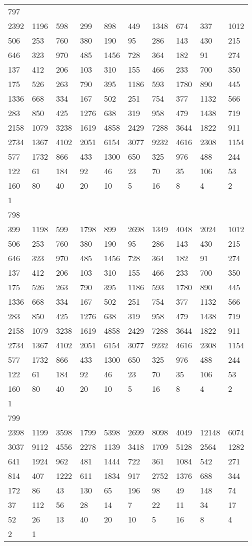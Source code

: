 \begin{longtable}{*{10}{l}}
797&&&&&&&&&\\
2392& 1196& 598& 299& 898& 449& 1348& 674& 337& 1012\\
506& 253& 760& 380& 190& 95& 286& 143& 430& 215\\
646& 323& 970& 485& 1456& 728& 364& 182& 91& 274\\
137& 412& 206& 103& 310& 155& 466& 233& 700& 350\\
175& 526& 263& 790& 395& 1186& 593& 1780& 890& 445\\
1336& 668& 334& 167& 502& 251& 754& 377& 1132& 566\\
283& 850& 425& 1276& 638& 319& 958& 479& 1438& 719\\
2158& 1079& 3238& 1619& 4858& 2429& 7288& 3644& 1822& 911\\
2734& 1367& 4102& 2051& 6154& 3077& 9232& 4616& 2308& 1154\\
577& 1732& 866& 433& 1300& 650& 325& 976& 488& 244\\
122& 61& 184& 92& 46& 23& 70& 35& 106& 53\\
160& 80& 40& 20& 10& 5& 16& 8& 4& 2\\
1& \\

798&&&&&&&&&\\
399& 1198& 599& 1798& 899& 2698& 1349& 4048& 2024& 1012\\
506& 253& 760& 380& 190& 95& 286& 143& 430& 215\\
646& 323& 970& 485& 1456& 728& 364& 182& 91& 274\\
137& 412& 206& 103& 310& 155& 466& 233& 700& 350\\
175& 526& 263& 790& 395& 1186& 593& 1780& 890& 445\\
1336& 668& 334& 167& 502& 251& 754& 377& 1132& 566\\
283& 850& 425& 1276& 638& 319& 958& 479& 1438& 719\\
2158& 1079& 3238& 1619& 4858& 2429& 7288& 3644& 1822& 911\\
2734& 1367& 4102& 2051& 6154& 3077& 9232& 4616& 2308& 1154\\
577& 1732& 866& 433& 1300& 650& 325& 976& 488& 244\\
122& 61& 184& 92& 46& 23& 70& 35& 106& 53\\
160& 80& 40& 20& 10& 5& 16& 8& 4& 2\\
1& \\

799&&&&&&&&&\\
2398& 1199& 3598& 1799& 5398& 2699& 8098& 4049& 12148& 6074\\
3037& 9112& 4556& 2278& 1139& 3418& 1709& 5128& 2564& 1282\\
641& 1924& 962& 481& 1444& 722& 361& 1084& 542& 271\\
814& 407& 1222& 611& 1834& 917& 2752& 1376& 688& 344\\
172& 86& 43& 130& 65& 196& 98& 49& 148& 74\\
37& 112& 56& 28& 14& 7& 22& 11& 34& 17\\
52& 26& 13& 40& 20& 10& 5& 16& 8& 4\\
2& 1& \\


\end{longtable}
